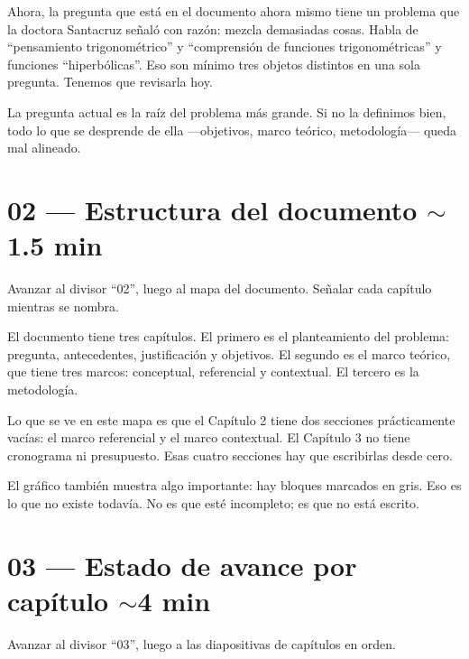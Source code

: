 \documentclass[11pt, letterpaper]{article}
\newenvironment{accion}{%
  \par\smallskip
  \color{GrisAnotacion}\small\itshape\faHandPointRight\enspace
}{%
  \par\smallskip\normalcolor\normalsize\normalfont
}
\begin{document}
Ahora, la pregunta que está en el documento ahora mismo tiene un problema que la doctora Santacruz señaló con razón: mezcla demasiadas cosas. Habla de ``pensamiento trigonométrico'' y ``comprensión de funciones trigonométricas'' y funciones ``hiperbólicas''. Eso son mínimo tres objetos distintos en una sola pregunta. Tenemos que revisarla hoy.

\begin{clave}
  \faExclamationTriangle\enspace La pregunta actual es la raíz del problema más
  grande. Si no la definimos bien, todo lo que se desprende de ella —objetivos,
  marco teórico, metodología— queda mal alineado.
\end{clave}

\section{02 — Estructura del documento \hfill {\normalfont\small\color{GrisAnotacion}$\sim$1.5 min}}

\begin{accion}
  Avanzar al divisor ``02'', luego al mapa del documento.
  Señalar cada capítulo mientras se nombra.
\end{accion}

El documento tiene tres capítulos. El primero es el planteamiento del problema: pregunta, antecedentes, justificación y objetivos. El segundo es el marco teórico, que tiene tres marcos: conceptual, referencial y contextual. El tercero es la metodología.

Lo que se ve en este mapa es que el Capítulo 2 tiene dos secciones prácticamente vacías: el marco referencial y el marco contextual. El Capítulo 3 no tiene cronograma ni presupuesto. Esas cuatro secciones hay que escribirlas desde cero.

El gráfico también muestra algo importante: hay bloques marcados en gris. Eso es lo que no existe todavía. No es que esté incompleto; es que no está escrito.

\section{03 — Estado de avance por capítulo \hfill {\normalfont\small\color{GrisAnotacion}$\sim$4 min}}

\begin{accion}
  Avanzar al divisor ``03'', luego a las diapositivas de capítulos en orden.
\end{accion}
\end{document}
